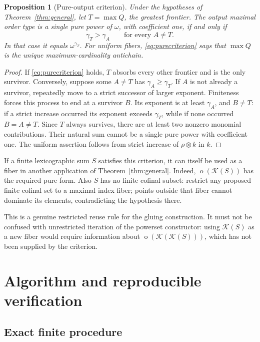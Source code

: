 \documentclass[11pt,a4paper]{article}
\newtheorem{proposition}[theorem]{Proposition}
\theoremstyle{definition}
\theoremstyle{remark}
\newcommand{\K}{\mathcal K}
\newcommand{\ot}{\operatorname{o}}
\newcommand{\np}{\mathbin{\otimes}}
\begin{document}
\begin{proposition}[Pure-output criterion]\label{prop:pure}
Under the hypotheses of Theorem~\ref{thm:general}, let $T=\max Q$, the
greatest frontier. The output maximal order type is a single pure power
of $\omega$, with coefficient one, if and only if
\begin{equation}\label{eq:purecriterion}
 \gamma_T>\gamma_A\qquad\text{for every }A\ne T.
\end{equation}
In that case it equals $\omega^{\gamma_T}$. For uniform fibers,
\eqref{eq:purecriterion} says that $\max Q$ is the unique
maximum-cardinality antichain.
\end{proposition}

\begin{proof}
If \eqref{eq:purecriterion} holds, $T$ absorbs every other frontier and is
the only survivor. Conversely, suppose some $A\ne T$ has
$\gamma_A\ge\gamma_T$. If $A$ is not already a survivor, repeatedly move
to a strict successor of larger exponent. Finiteness forces this process
to end at a survivor $B$. Its exponent is at least $\gamma_A$, and $B\ne T$:
if a strict increase occurred its exponent exceeds $\gamma_T$, while if
none occurred $B=A\ne T$. Since $T$ always survives, there are at least
two nonzero monomial contributions. Their natural sum cannot be a single
pure power with coefficient one. The uniform assertion follows from
strict increase of $\rho\np k$ in $k$.
\end{proof}

If a finite lexicographic sum $S$ satisfies this criterion, it can itself
be used as a fiber in another application of Theorem~\ref{thm:general}.
Indeed, $\ot(\K(S))$ has the required pure form. Also $S$ has no finite
cofinal subset: restrict any proposed finite cofinal set to a maximal
index fiber; points outside that fiber cannot dominate its elements,
contradicting the hypothesis there.

This is a genuine restricted reuse rule for the gluing construction. It
must not be confused with unrestricted iteration of the powerset
constructor: using $\K(S)$ as a new fiber would require information about
$\ot(\K(\K(S)))$, which has not been supplied by the criterion.

\section{Algorithm and reproducible verification}\label{sec:algorithm}

\subsection{Exact finite procedure}
\end{document}
